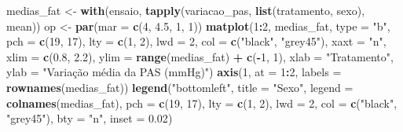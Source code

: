 \documentclass[
]{book}
\newenvironment{Shaded}{\begin{snugshade}}{\end{snugshade}}
\newcommand{\AttributeTok}[1]{\textcolor[rgb]{0.13,0.29,0.53}{#1}}
\newcommand{\DecValTok}[1]{\textcolor[rgb]{0.00,0.00,0.81}{#1}}
\newcommand{\FloatTok}[1]{\textcolor[rgb]{0.00,0.00,0.81}{#1}}
\newcommand{\FunctionTok}[1]{\textcolor[rgb]{0.13,0.29,0.53}{\textbf{#1}}}
\newcommand{\NormalTok}[1]{#1}
\newcommand{\OtherTok}[1]{\textcolor[rgb]{0.56,0.35,0.01}{#1}}
\newcommand{\SpecialCharTok}[1]{\textcolor[rgb]{0.81,0.36,0.00}{\textbf{#1}}}
\newcommand{\StringTok}[1]{\textcolor[rgb]{0.31,0.60,0.02}{#1}}
\begin{document}
\begin{Shaded}
\begin{Highlighting}[]
\NormalTok{medias\_fat }\OtherTok{\textless{}{-}} \FunctionTok{with}\NormalTok{(ensaio, }\FunctionTok{tapply}\NormalTok{(variacao\_pas, }\FunctionTok{list}\NormalTok{(tratamento, sexo), mean))}
\NormalTok{op }\OtherTok{\textless{}{-}} \FunctionTok{par}\NormalTok{(}\AttributeTok{mar =} \FunctionTok{c}\NormalTok{(}\DecValTok{4}\NormalTok{, }\FloatTok{4.5}\NormalTok{, }\DecValTok{1}\NormalTok{, }\DecValTok{1}\NormalTok{))}
\FunctionTok{matplot}\NormalTok{(}\DecValTok{1}\SpecialCharTok{:}\DecValTok{2}\NormalTok{, medias\_fat, }\AttributeTok{type =} \StringTok{"b"}\NormalTok{, }\AttributeTok{pch =} \FunctionTok{c}\NormalTok{(}\DecValTok{19}\NormalTok{, }\DecValTok{17}\NormalTok{), }\AttributeTok{lty =} \FunctionTok{c}\NormalTok{(}\DecValTok{1}\NormalTok{, }\DecValTok{2}\NormalTok{), }\AttributeTok{lwd =} \DecValTok{2}\NormalTok{,}
        \AttributeTok{col =} \FunctionTok{c}\NormalTok{(}\StringTok{"black"}\NormalTok{, }\StringTok{"grey45"}\NormalTok{), }\AttributeTok{xaxt =} \StringTok{"n"}\NormalTok{, }\AttributeTok{xlim =} \FunctionTok{c}\NormalTok{(}\FloatTok{0.8}\NormalTok{, }\FloatTok{2.2}\NormalTok{),}
        \AttributeTok{ylim =} \FunctionTok{range}\NormalTok{(medias\_fat) }\SpecialCharTok{+} \FunctionTok{c}\NormalTok{(}\SpecialCharTok{{-}}\DecValTok{1}\NormalTok{, }\DecValTok{1}\NormalTok{),}
        \AttributeTok{xlab =} \StringTok{"Tratamento"}\NormalTok{, }\AttributeTok{ylab =} \StringTok{"Variação média da PAS (mmHg)"}\NormalTok{)}
\FunctionTok{axis}\NormalTok{(}\DecValTok{1}\NormalTok{, }\AttributeTok{at =} \DecValTok{1}\SpecialCharTok{:}\DecValTok{2}\NormalTok{, }\AttributeTok{labels =} \FunctionTok{rownames}\NormalTok{(medias\_fat))}
\FunctionTok{legend}\NormalTok{(}\StringTok{"bottomleft"}\NormalTok{, }\AttributeTok{title =} \StringTok{"Sexo"}\NormalTok{, }\AttributeTok{legend =} \FunctionTok{colnames}\NormalTok{(medias\_fat), }\AttributeTok{pch =} \FunctionTok{c}\NormalTok{(}\DecValTok{19}\NormalTok{, }\DecValTok{17}\NormalTok{),}
       \AttributeTok{lty =} \FunctionTok{c}\NormalTok{(}\DecValTok{1}\NormalTok{, }\DecValTok{2}\NormalTok{), }\AttributeTok{lwd =} \DecValTok{2}\NormalTok{, }\AttributeTok{col =} \FunctionTok{c}\NormalTok{(}\StringTok{"black"}\NormalTok{, }\StringTok{"grey45"}\NormalTok{), }\AttributeTok{bty =} \StringTok{"n"}\NormalTok{, }\AttributeTok{inset =} \FloatTok{0.02}\NormalTok{)}
\end{Highlighting}
\end{Shaded}
\end{document}
